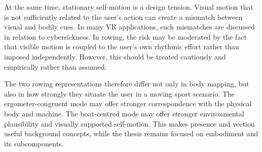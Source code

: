 At the same time, stationary self-motion is a design tension. Visual motion that is not sufficiently related to the user's action can create a mismatch between visual and bodily cues. In many VR applications, such mismatches are discussed in relation to cybersickness. In rowing, the risk may be moderated by the fact that visible motion is coupled to the user's own rhythmic effort rather than imposed independently. However, this should be treated cautiously and empirically rather than assumed.

The two rowing representations therefore differ not only in body mapping, but also in how strongly they situate the user in a moving sport scenario. The ergometer-congruent mode may offer stronger correspondence with the physical body and machine. The boat-centred mode may offer stronger environmental plausibility and visually supported self-motion. This makes presence and vection useful background concepts, while the thesis remains focused on embodiment and its subcomponents.
